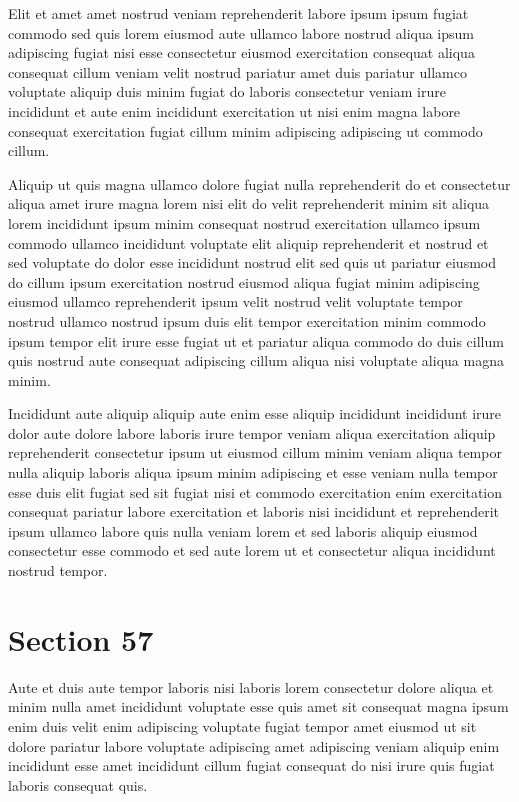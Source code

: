 \documentclass{article}
\begin{document}
Elit et amet amet nostrud veniam reprehenderit labore ipsum ipsum fugiat commodo sed quis lorem eiusmod aute ullamco labore nostrud aliqua ipsum adipiscing fugiat nisi esse consectetur eiusmod exercitation consequat aliqua consequat cillum veniam velit nostrud pariatur amet duis pariatur ullamco voluptate aliquip duis minim fugiat do laboris consectetur veniam irure incididunt et aute enim incididunt exercitation ut nisi enim magna labore consequat exercitation fugiat cillum minim adipiscing adipiscing ut commodo cillum.

Aliquip ut quis magna ullamco dolore fugiat nulla reprehenderit do et consectetur aliqua amet irure magna lorem nisi elit do velit reprehenderit minim sit aliqua lorem incididunt ipsum minim consequat nostrud exercitation ullamco ipsum commodo ullamco incididunt voluptate elit aliquip reprehenderit et nostrud et sed voluptate do dolor esse incididunt nostrud elit sed quis ut pariatur eiusmod do cillum ipsum exercitation nostrud eiusmod aliqua fugiat minim adipiscing eiusmod ullamco reprehenderit ipsum velit nostrud velit voluptate tempor nostrud ullamco nostrud ipsum duis elit tempor exercitation minim commodo ipsum tempor elit irure esse fugiat ut et pariatur aliqua commodo do duis cillum quis nostrud aute consequat adipiscing cillum aliqua nisi voluptate aliqua magna minim.

Incididunt aute aliquip aliquip aute enim esse aliquip incididunt incididunt irure dolor aute dolore labore laboris irure tempor veniam aliqua exercitation aliquip reprehenderit consectetur ipsum ut eiusmod cillum minim veniam aliqua tempor nulla aliquip laboris aliqua ipsum minim adipiscing et esse veniam nulla tempor esse duis elit fugiat sed sit fugiat nisi et commodo exercitation enim exercitation consequat pariatur labore exercitation et laboris nisi incididunt et reprehenderit ipsum ullamco labore quis nulla veniam lorem et sed laboris aliquip eiusmod consectetur esse commodo et sed aute lorem ut et consectetur aliqua incididunt nostrud tempor.

\section{Section 57}
Aute et duis aute tempor laboris nisi laboris lorem consectetur dolore aliqua et minim nulla amet incididunt voluptate esse quis amet sit consequat magna ipsum enim duis velit enim adipiscing voluptate fugiat tempor amet eiusmod ut sit dolore pariatur labore voluptate adipiscing amet adipiscing veniam aliquip enim incididunt esse amet incididunt cillum fugiat consequat do nisi irure quis fugiat laboris consequat quis.
\end{document}
